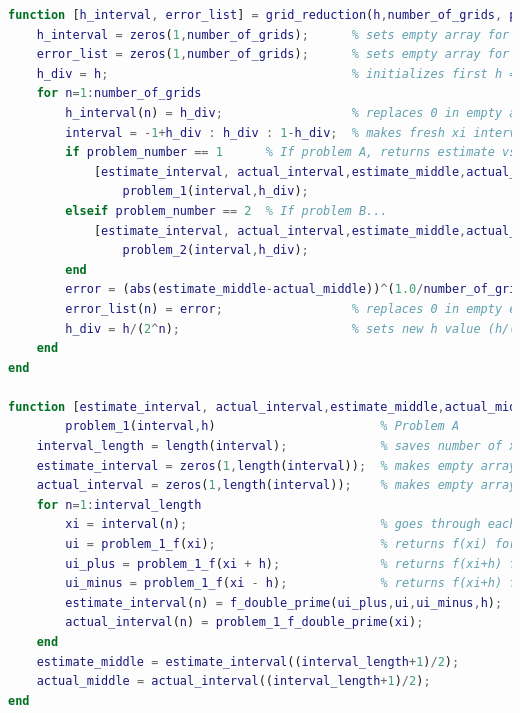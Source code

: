 \documentclass[10pt,letterpaper]{article}
\begin{document}
\begin{lstlisting}[language = Matlab]
%% Functions used for calculations
function [h_interval, error_list] = grid_reduction(h,number_of_grids, problem_number)
    h_interval = zeros(1,number_of_grids);      % sets empty array for future h/# values
    error_list = zeros(1,number_of_grids);      % sets empty array for error approximations
    h_div = h;                                  % initializes first h = h
    for n=1:number_of_grids
        h_interval(n) = h_div;                  % replaces 0 in empty array with actual h/# value
        interval = -1+h_div : h_div : 1-h_div;  % makes fresh xi interval with h/# as gap
        if problem_number == 1      % If problem A, returns estimate vs actual for each xi based on h/# gap AND estimate and actual middle value for loglog graph
            [estimate_interval, actual_interval,estimate_middle,actual_middle] = ...
                problem_1(interval,h_div);
        elseif problem_number == 2  % If problem B...
            [estimate_interval, actual_interval,estimate_middle,actual_middle] = ...
                problem_2(interval,h_div);
        end
        error = (abs(estimate_middle-actual_middle))^(1.0/number_of_grids); % error approximation
        error_list(n) = error;                  % replaces 0 in empty error_list array with error approximation
        h_div = h/(2^n);                        % sets new h value (h/(2^grid_size))
    end
end

function [estimate_interval, actual_interval,estimate_middle,actual_middle] = ...
        problem_1(interval,h)                       % Problem A
    interval_length = length(interval);             % saves number of xi's in x_interval
    estimate_interval = zeros(1,length(interval));  % makes empty array for estimate f"(x)
    actual_interval = zeros(1,length(interval));    % makes empty array for actual f"(x)
    for n=1:interval_length
        xi = interval(n);                           % goes through each xi
        ui = problem_1_f(xi);                       % returns f(xi) for f"(xi) estimation
        ui_plus = problem_1_f(xi + h);              % returns f(xi+h) for f"(xi) estimation
        ui_minus = problem_1_f(xi - h);             % returns f(xi+h) for f"(xi) estimation
        estimate_interval(n) = f_double_prime(ui_plus,ui,ui_minus,h);   % estimate f"(xi)
        actual_interval(n) = problem_1_f_double_prime(xi);              % actual f"(xi)
    end
    estimate_middle = estimate_interval((interval_length+1)/2);         % since x_interval will always have an odd number of values,
    actual_middle = actual_interval((interval_length+1)/2);             % (interval_length+1)/2 will always return middle estimate/actual
end


\end{lstlisting}
\end{document}

